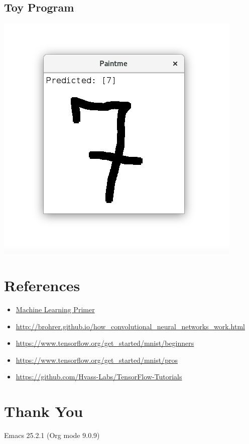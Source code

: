 \documentclass[11pt]{article}
\begin{document}
\subsection*{Toy Program}
\label{sec:org07f6f43}
\begin{center}
\begin{center}
\includegraphics[width=.9\linewidth]{images/toy_program.png}
\end{center}
\end{center}
\section*{References}
\label{sec:org9b52b7f}
\begin{itemize}
\item \href{https://github.com/PythonWorkshop/intro-to-tensorflow/blob/master/MathPrimer/Math\%20primer\%20for\%20ML\%20\%26\%20TensorFlow\%20workshop.ipynb}{Machine Learning Primer}
\item \url{http://brohrer.github.io/how\_convolutional\_neural\_networks\_work.html}
\item \url{https://www.tensorflow.org/get\_started/mnist/beginners}
\item \url{https://www.tensorflow.org/get\_started/mnist/pros}
\item \url{https://github.com/Hvass-Labs/TensorFlow-Tutorials}
\end{itemize}

\section*{Thank You}
\label{sec:org5b7e8f2}
Emacs 25.2.1 (Org mode 9.0.9)
\end{document}
